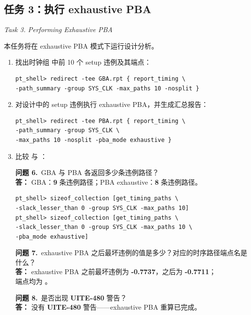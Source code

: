 \subsection{任务 3：执行 exhaustive PBA}
\label{lab7:task3}

\noindent\textit{Task 3. Performing Exhaustive PBA}

本任务将在 exhaustive PBA 模式下运行设计分析。

\begin{enumerate}
  \item 找出时钟组  中前 10 个 setup 违例及其端点：
\begin{lstlisting}
pt_shell> redirect -tee GBA.rpt { report_timing \
-path_summary -group SYS_CLK -max_paths 10 -nosplit }
\end{lstlisting}

  \item 对设计中的 setup 违例执行 exhaustive PBA，并生成汇总报告：
\begin{lstlisting}
pt_shell> redirect -tee PBA.rpt { report_timing \
-path_summary -group SYS_CLK \
-max_paths 10 -nosplit -pba_mode exhaustive }
\end{lstlisting}

  \item 比较  与 ：
\begin{questionBox}
\textbf{问题 6.}\ GBA 与 PBA 各返回多少条违例路径？\\[0.35em]
\textbf{答：} GBA：\textbf{9} 条违例路径；PBA exhaustive：\textbf{8} 条违例路径。
\end{questionBox}

\begin{lstlisting}
pt_shell> sizeof_collection [get_timing_paths \
-slack_lesser_than 0 -group SYS_CLK -max_paths 10]
pt_shell> sizeof_collection [get_timing_paths \
-slack_lesser_than 0 -group SYS_CLK -max_paths 10 \
-pba_mode exhaustive]
\end{lstlisting}

\begin{questionBox}
\textbf{问题 7.}\ exhaustive PBA 之后最坏违例的值是多少？对应的时序路径端点名是什么？\\[0.35em]
\textbf{答：} exhaustive PBA 之前最坏违例为 \textbf{-0.7737}，之后为 \textbf{-0.7711}；\\
端点均为 。

\textbf{问题 8.}\ 是否出现 \textbf{UITE-480} 警告？\\[0.35em]
\textbf{答：} 没有 \textbf{UITE-480} 警告——exhaustive PBA 重算已完成。
\end{questionBox}
\end{enumerate}

